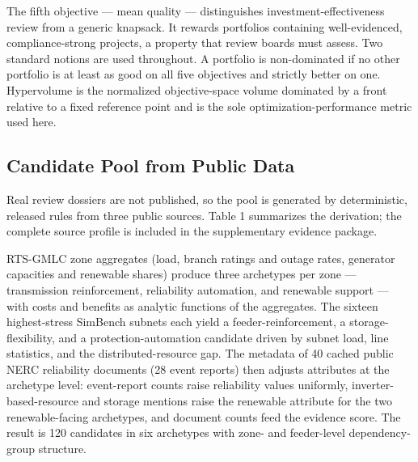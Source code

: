 \documentclass[energies,article,submit,moreauthors]{Definitions/mdpi}
\begin{document}
The fifth objective --- mean quality --- distinguishes investment-effectiveness review from a generic knapsack. It rewards portfolios containing well-evidenced, compliance-strong projects, a property that review boards must assess. Two standard notions are used throughout. A portfolio is non-dominated if no other portfolio is at least as good on all five objectives and strictly better on one. Hypervolume is the normalized objective-space volume dominated by a front relative to a fixed reference point and is the sole optimization-performance metric used here.

\subsection{Candidate Pool from Public Data}\label{candidate-pool-from-public-data}

Real review dossiers are not published, so the pool is generated by deterministic, released rules from three public sources. Table 1 summarizes the derivation; the complete source profile is included in the supplementary evidence package.

RTS-GMLC zone aggregates (load, branch ratings and outage rates, generator capacities and renewable shares) produce three archetypes per zone --- transmission reinforcement, reliability automation, and renewable support --- with costs and benefits as analytic functions of the aggregates. The sixteen highest-stress SimBench subnets each yield a feeder-reinforcement, a storage-flexibility, and a protection-automation candidate driven by subnet load, line statistics, and the distributed-resource gap. The metadata of 40 cached public NERC reliability documents (28 event reports) then adjusts attributes at the archetype level: event-report counts raise reliability values uniformly, inverter-based-resource and storage mentions raise the renewable attribute for the two renewable-facing archetypes, and document counts feed the evidence score. The result is 120 candidates in six archetypes with zone- and feeder-level dependency-group structure.
\end{document}
